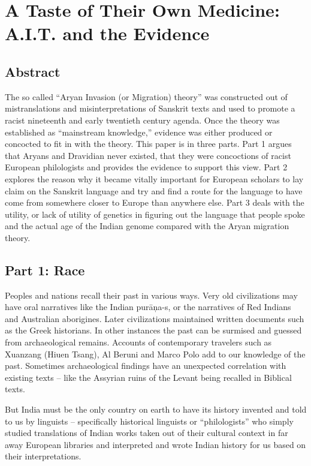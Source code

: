 
\chapter{A Taste of Their Own Medicine:\\ A.I.T. and the Evidence}\label{chap07}



\section*{Abstract}

The so called “Aryan Invasion (or Migration) theory” was constructed out of mistranslations and misinterpretations of Sanskrit texts and used to promote a racist nineteenth and early twentieth century agenda. Once the theory was established as “mainstream knowledge,” evidence was either produced or concocted to fit in with the theory. This paper is in three parts. Part 1 argues that Aryans and Dravidian never existed, that they were concoctions of racist European philologists and provides the evidence to support this view. Part 2 explores the reason why it became vitally important for European scholars to lay claim on the Sanskrit language and try and find a route for the language to have come from somewhere closer to Europe than anywhere else. Part 3 deals with the utility, or lack of utility of genetics in figuring out the language that people spoke and the actual age of the Indian genome compared with the Aryan migration theory.


\section*{Part 1: Race}

Peoples and nations recall their past in various ways. Very old civilizations may have oral narratives like the Indian purāņa-s, or the narratives of Red Indians and Australian aborigines. Later civilizations maintained written documents such as the Greek historians. In other instances the past can be surmised and guessed from archaeological remains. Accounts of contemporary travelers such as Xuanzang (Hiuen Tsang), Al Beruni and Marco Polo add to our knowledge of the past. Sometimes archaeological findings have an unexpected correlation with existing texts – like the Assyrian ruins of the Levant being recalled in Biblical texts.

But India must be the only country on earth to have its history invented and told to us by linguists – specifically historical linguists or “philologists” who simply studied translations of Indian works taken out of their cultural context in far away European libraries and interpreted and wrote Indian history for us based on their interpretations.

